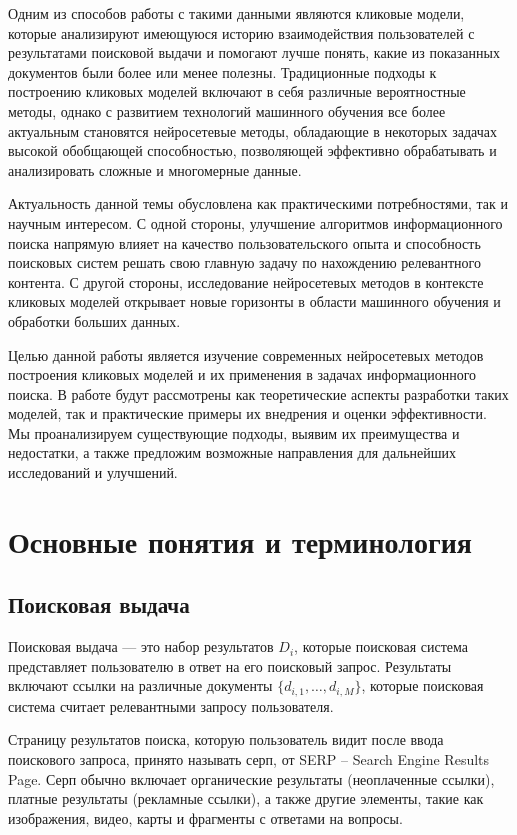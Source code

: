 \documentclass[diploma]{nanolab2015}
\begin{document}
Одним из способов работы с такими данными являются кликовые модели, которые анализируют имеющуюся историю взаимодействия пользователей с результатами поисковой выдачи и помогают лучше понять, какие из показанных документов были более или менее полезны. Традиционные подходы к построению кликовых моделей включают в себя различные вероятностные методы, однако с развитием технологий машинного обучения все более актуальным становятся нейросетевые методы, обладающие в некоторых задачах высокой обобщающей способностью, позволяющей эффективно обрабатывать и анализировать сложные и многомерные данные.

Актуальность данной темы обусловлена как практическими потребностями, так и научным интересом. С одной стороны, улучшение алгоритмов информационного поиска напрямую влияет на качество пользовательского опыта и способность поисковых систем решать свою главную задачу по нахождению релевантного контента. С другой стороны, исследование нейросетевых методов в контексте кликовых моделей открывает новые горизонты в области машинного обучения и обработки больших данных.

Целью данной работы является изучение современных нейросетевых методов построения кликовых моделей и их применения в задачах информационного поиска. В работе будут рассмотрены как теоретические аспекты разработки таких моделей, так и практические примеры их внедрения и оценки эффективности. Мы проанализируем существующие подходы, выявим их преимущества и недостатки, а также предложим возможные направления для дальнейших исследований и улучшений.
\newpage
\section{Основные понятия и терминология}
\subsection{Поисковая выдача}

Поисковая выдача — это набор результатов $D_i$, которые поисковая система представляет пользователю в ответ на его поисковый запрос. Результаты включают ссылки на различные документы $\{d_{i,1}, \dots, d_{i, M}\}$, которые поисковая система считает релевантными запросу пользователя.

Страницу результатов поиска, которую пользователь видит после ввода поискового запроса, принято называть серп, от SERP -- Search Engine Results Page. Серп обычно включает органические результаты (неоплаченные ссылки), платные результаты (рекламные ссылки), а также другие элементы, такие как изображения, видео, карты и фрагменты с ответами на вопросы.
\end{document}
